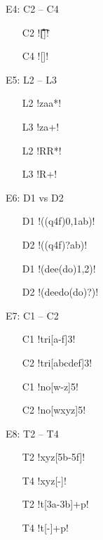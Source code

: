 E4: C2 -- C4
\vspace{-2mm}
\begin{itemize}[noitemsep,topsep=0pt]
\item[C2] \cverb![\t\r\f\n ]!
\item[C4] \cverb![\s]!
\end{itemize}
\vspace{5mm}

E5: L2 -- L3
\vspace{-2mm}
\begin{multicols}{2}
\begin{itemize}[noitemsep,topsep=0pt]
\item[L2] \cverb!zaa*!
\item[L3] \cverb!za+!
\item[L2] \cverb!RR*!
\item[L3] \cverb!R+!
\end{itemize}
\end{multicols}
\vspace{5mm}

E6: D1 vs D2
\vspace{-2mm}
\begin{multicols}{2}
\begin{itemize}[noitemsep,topsep=0pt]
\item[D1] \cverb!((q4f){0,1}ab)!
\item[D2] \cverb!((q4f)?ab)!
\item[D1] \cverb!(dee(do){1,2})!
\item[D2] \cverb!(deedo(do)?)!
\end{itemize}
\end{multicols}
\vspace{5mm}

E7: C1 -- C2
\vspace{-2mm}
\begin{multicols}{2}
\begin{itemize}[noitemsep,topsep=0pt]
\item[C1] \cverb!tri[a-f]3!
\item[C2] \cverb!tri[abcdef]3!
\item[C1] \cverb!no[w-z]5!
\item[C2] \cverb!no[wxyz]5!
\end{itemize}
\end{multicols}
\vspace{5mm}

E8: T2 -- T4
\vspace{-2mm}
\begin{multicols}{2}
\begin{itemize}[noitemsep,topsep=0pt]
\item[T2] \cverb!xyz[\x5b-\x5f]!
\item[T4] \cverb!xyz[-]!
\item[T2] \cverb!t[\x3a-\x3b]+p!
\item[T4] \cverb!t[-]+p!
\end{itemize}
\end{multicols}
\vspace{5mm}

